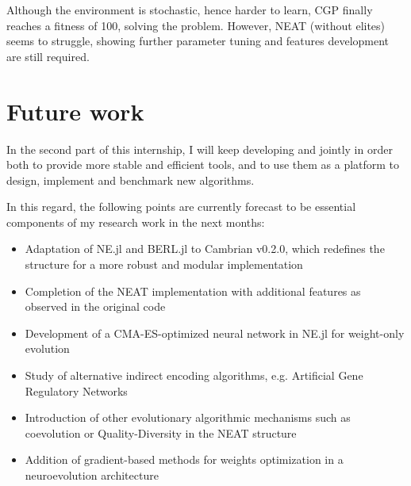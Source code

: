Although the environment is stochastic, hence harder to learn, CGP finally reaches a fitness of 100, solving the problem. However, NEAT (without elites) seems to struggle, showing further parameter tuning and features development are  still required. 


\section{Future work}

In the second part of this internship, I will keep developing  and  jointly in order both to provide more stable and efficient tools, and to use them as a platform to design, implement and benchmark new algorithms. 

In this regard, the following points are currently forecast to be essential components of my research work in the next months:
\begin{itemize}
    \item Adaptation of NE.jl and BERL.jl to Cambrian v0.2.0, which redefines the structure for a more robust and modular implementation
    \item Completion of the NEAT implementation with additional features as observed in the original code
    \item Development of a CMA-ES-optimized neural network in NE.jl for weight-only evolution
    \item Study of alternative indirect encoding algorithms, e.g. Artificial Gene Regulatory Networks \cite{GRN}
    \item Introduction of other evolutionary algorithmic mechanisms such as coevolution or Quality-Diversity in the NEAT structure
    \item Addition of gradient-based methods for weights optimization in a neuroevolution architecture
\end{itemize}



